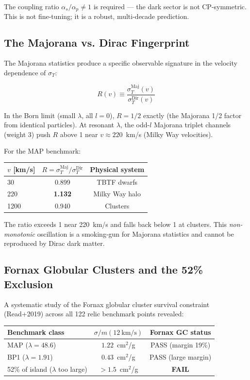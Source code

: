 \documentclass[12pt, a4paper]{article}
\begin{document}
The coupling ratio $\alpha_s/\alpha_p \neq 1$ is required --- the dark sector is not CP-symmetric. This is not fine-tuning; it is a robust, multi-decade prediction.

\subsection{The Majorana vs. Dirac Fingerprint}

The Majorana statistics produce a specific observable signature in the velocity dependence of $\sigma_T$:

\begin{equation}
  R(v) \equiv \frac{\sigma_T^\text{Maj}(v)}{\sigma_T^\text{Dir}(v)}
\end{equation}

In the Born limit (small $\lambda$, all $l = 0$), $R = 1/2$ exactly (the Majorana 1/2 factor from identical particles). At resonant $\lambda$, the odd-$l$ Majorana triplet channels (weight 3) push $R$ above 1 near $v \approx 220$~km/s (Milky Way velocities).

For the MAP benchmark:
\begin{center}
\begin{tabular}{lcc}
  \toprule
  $v$ [km/s] & $R = \sigma_T^\text{Maj}/\sigma_T^\text{Dir}$ & Physical system \\
  \midrule
  30 & 0.899 & TBTF dwarfs \\
  220 & \textbf{1.132} & Milky Way halo \\
  1200 & 0.940 & Clusters \\
  \bottomrule
\end{tabular}
\end{center}

The ratio exceeds 1 near 220~km/s and falls back below 1 at clusters. This \emph{non-monotonic} oscillation is a smoking-gun for Majorana statistics and cannot be reproduced by Dirac dark matter.

\subsection{Fornax Globular Clusters and the 52\% Exclusion}

A systematic study of the Fornax globular cluster survival constraint (Read+2019) across all 122 relic benchmark points revealed:

\begin{center}
\begin{tabular}{lcc}
  \toprule
  Benchmark class & $\sigma/m(12~\text{km/s})$ & Fornax GC status \\
  \midrule
  MAP ($\lambda = 48.6$) & $1.22$~cm$^2$/g & PASS (margin 19\%) \\
  BP1 ($\lambda = 1.91$) & $0.43$~cm$^2$/g & PASS (large margin) \\
  52\% of island ($\lambda$ too large) & $> 1.5$~cm$^2$/g & \textbf{FAIL} \\
  \bottomrule
\end{tabular}
\end{center}
\end{document}
